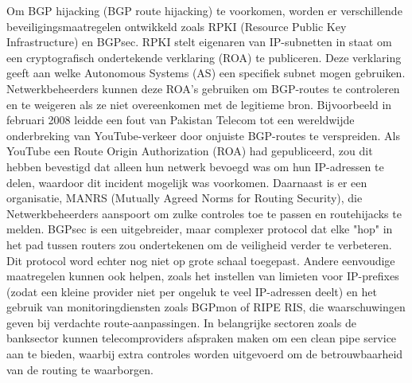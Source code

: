 Om BGP hijacking (BGP route hijacking) te voorkomen, worden er verschillende beveiligingsmaatregelen ontwikkeld zoals RPKI (Resource Public Key Infrastructure) en BGPsec. RPKI stelt eigenaren van IP-subnetten in staat om een cryptografisch ondertekende verklaring (ROA) te publiceren. Deze verklaring geeft aan welke Autonomous Systems (AS) een specifiek subnet mogen gebruiken. Netwerkbeheerders kunnen deze ROA’s gebruiken om BGP-routes te controleren en te weigeren als ze niet overeenkomen met de legitieme bron\autocite{IJANA2024}.
Bijvoorbeeld in februari 2008 leidde een fout van Pakistan Telecom tot een wereldwijde onderbreking van YouTube-verkeer door onjuiste BGP-routes te verspreiden. Als YouTube een Route Origin Authorization (ROA) had gepubliceerd, zou dit hebben bevestigd dat alleen hun netwerk bevoegd was om hun IP-adressen te delen, waardoor dit incident mogelijk was voorkomen\autocite{ripe2008}.
Daarnaast is er een organisatie, MANRS (Mutually Agreed Norms for Routing Security), die Netwerkbeheerders aanspoort om zulke controles toe te passen en routehijacks te melden. BGPsec is een uitgebreider, maar complexer protocol dat elke "hop" in het pad tussen routers zou ondertekenen om de veiligheid verder te verbeteren. Dit protocol word echter nog niet op grote schaal toegepast\autocite{Lepinski2017}.
Andere eenvoudige maatregelen kunnen ook helpen, zoals het instellen van limieten voor IP-prefixes (zodat een kleine provider niet per ongeluk te veel IP-adressen deelt) en het gebruik van monitoringdiensten zoals BGPmon of RIPE RIS, die waarschuwingen geven bij verdachte route-aanpassingen\autocite{ripe202}. In belangrijke sectoren zoals de banksector kunnen telecomproviders afspraken maken om een clean pipe service aan te bieden, waarbij extra controles worden uitgevoerd om de betrouwbaarheid van de routing te waarborgen\autocite{nexusguardcleanpipe}.
\vspace{0.5cm}
\vspace{0.5cm}
\section{}
\label{sec:Educatie en Beleid als Aanvulling op Technologische Oplossingen}

\vspace{0.5cm}
\vspace{0.5cm}
\vspace{0.5cm}


